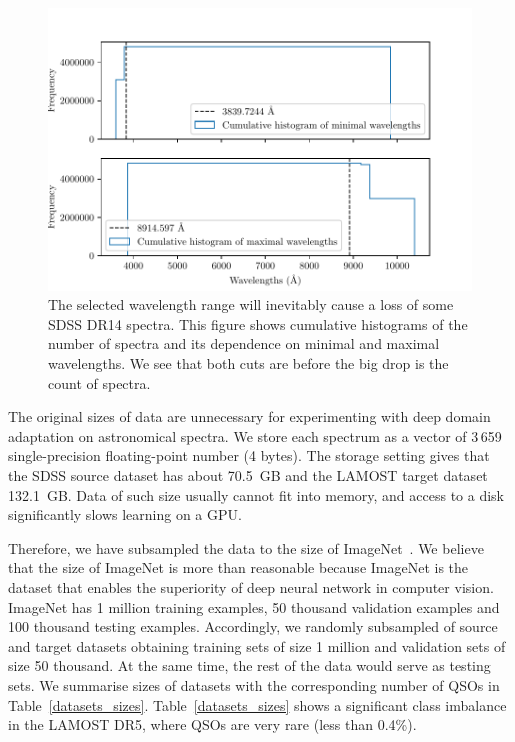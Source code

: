 \begin{figure}
\includegraphics[width=\textwidth]{img/waves_cumulative_hist.pdf}
\caption[Losts in SDSS DR14 spectra due to wavelength range]{
	The selected wavelength range will inevitably
	cause a loss of some SDSS DR14 spectra.
	This figure shows cumulative histograms of the number of spectra
	and its dependence on minimal and maximal wavelengths.
	We see that both cuts are before the big drop is the count of spectra.
	}
\label{waves_cumulative_hist}
\end{figure}

The original sizes of data are unnecessary for experimenting with deep domain adaptation on astronomical spectra.
We store each spectrum as a vector of 3\,659 single-precision floating-point number (4 bytes).
The storage setting gives that the SDSS source dataset has about 70.5~GB
and the LAMOST target dataset 132.1~GB.
Data of such size usually cannot fit into memory,
and access to a disk significantly slows learning on a GPU.

Therefore, we have subsampled the data to the size of ImageNet~\cite{russakovsky2015}.
We believe that the size of ImageNet is more than reasonable
because ImageNet is the dataset that enables the superiority of deep neural network in computer vision.
ImageNet has 1 million training examples, 50 thousand validation examples
and 100 thousand testing examples.
Accordingly, we randomly subsampled of source and target datasets
obtaining training sets of size 1 million
and validation sets of size 50 thousand.
At the same time, the rest of the data would serve as testing sets.
We summarise sizes of datasets with the corresponding number of QSOs in Table~\ref{datasets_sizes}.
Table~\ref{datasets_sizes} shows a significant class imbalance in the LAMOST DR5,
where QSOs are very rare (less than 0.4\%).

